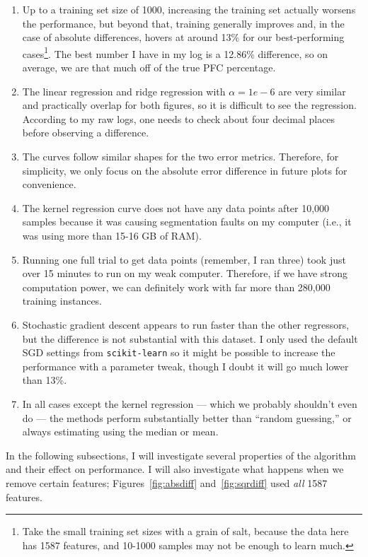 \documentclass[a4paper, 11pt]{article}
\begin{document}
\begin{enumerate}
    \item Up to a training set size of 1000, increasing the training set actually worsens the
    performance, but beyond that, training generally improves and, in the case of absolute
    differences, hovers at around 13\% for our best-performing cases\footnote{Take the small
    training set sizes with a grain of salt, because the data here has 1587 features, and 10-1000
    samples may not be enough to learn much.}. The best number I have in my log is a 12.86\%
    difference, so on average, we are that much off of the true PFC percentage.
    \item The linear regression and ridge regression with $\alpha = 1e-6$ are very similar and
    practically overlap for both figures, so it is difficult to see the regression. According to my
    raw logs, one needs to check about four decimal places before observing a difference.
    \item The curves follow similar shapes for the two error metrics. Therefore, for simplicity, we
    only focus on the absolute error difference in future plots for convenience.
    \item The kernel regression curve does not have any data points after 10,000 samples because it
    was causing segmentation faults on my computer (i.e., it was using more than 15-16 GB of RAM).
    \item Running one full trial to get data points (remember, I ran three) took just over 15
    minutes to run on my weak computer. Therefore, if we have strong computation power, we can
    definitely work with far more than 280,000 training instances.
    \item Stochastic gradient descent appears to run faster than the other regressors, but the
    difference is not substantial with this dataset. I only used the default SGD settings from
    \texttt{scikit-learn} so it might be possible to increase the performance with a parameter
    tweak, though I doubt it will go much lower than 13\%.
    \item In all cases except the kernel regression --- which we probably shouldn't even do --- the
    methods perform substantially better than ``random guessing,'' or always estimating using the
    median or mean.
\end{enumerate}

In the following subsections, I will investigate several properties of the algorithm and their
effect on performance. I will also investigate what happens when we remove certain features;
Figures~\ref{fig:absdiff} and~\ref{fig:sqrdiff} used \emph{all} 1587 features.
\end{document}
